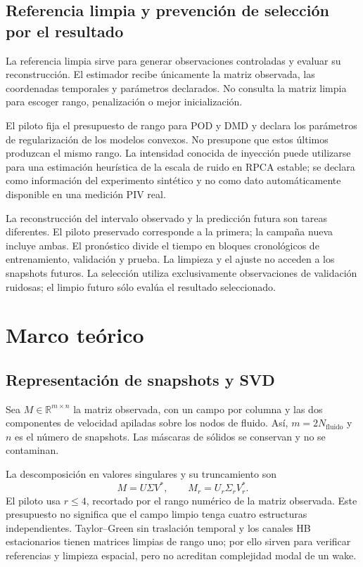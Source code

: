 \documentclass[11pt,oneside,openany]{book}
\newcommand{\R}{\mathbb{R}}
\begin{document}
\section{Referencia limpia y prevención de selección por el resultado}
La referencia limpia sirve para generar observaciones controladas y evaluar
su reconstrucción. El estimador recibe únicamente la matriz observada, las
coordenadas temporales y parámetros declarados. No consulta la matriz limpia
para escoger rango, penalización o mejor inicialización.

El piloto fija el presupuesto de rango para POD y DMD y declara los
parámetros de regularización de los modelos convexos. No presupone que
estos últimos produzcan el mismo rango. La intensidad conocida de inyección
puede utilizarse para una estimación heurística de la escala de ruido en
RPCA estable; se declara como información del experimento sintético y no
como dato automáticamente disponible en una medición PIV real.

La reconstrucción del intervalo observado y la predicción futura son tareas
diferentes. El piloto preservado corresponde a la primera; la campaña nueva
incluye ambas. El pronóstico divide el tiempo en bloques cronológicos de
entrenamiento, validación y prueba. La limpieza y el ajuste no acceden a los
snapshots futuros. La selección utiliza exclusivamente observaciones de
validación ruidosas; el limpio futuro sólo evalúa el resultado seleccionado.

\chapter{Marco teórico}
\section{Representación de snapshots y SVD}
Sea $M\in\R^{m\times n}$ la matriz observada, con un campo por columna y
las dos componentes de velocidad apiladas sobre los nodos de fluido.
Así, $m=2N_{\mathrm{fluido}}$ y $n$ es el número de snapshots. Las máscaras
de sólidos se conservan y no se contaminan.

La descomposición en valores singulares y su truncamiento son
\begin{equation}
 M=U\Sigma V^*,\qquad M_r=U_r\Sigma_rV_r^*.
\end{equation}
El piloto usa $r\leq4$, recortado por el rango numérico de la matriz
observada. Este presupuesto no significa que el campo limpio tenga cuatro
estructuras independientes. Taylor--Green sin traslación temporal y los
canales HB estacionarios tienen matrices limpias de rango uno; por ello
sirven para verificar referencias y limpieza espacial, pero no acreditan
complejidad modal de un wake.
\end{document}
